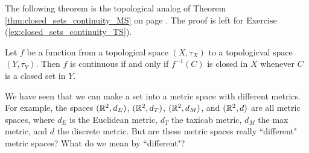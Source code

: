 \begin{comment}

\ActivitySolution

\ba

\item To show that $f$ is continuous we will prove that $f^{-1}(N)$ is a neighborhood of $a \in X$ whenever $N$ is a neighborhood of $f(a)$ in $Y$. 

\item Let $a \in X$ and let $N$ be a neighborhood of $f(a)$ in $Y$. Then $N$ contains an open set $O$ with $f(a) \in O$. 

\item By our hypothesis, we can conclude that $f^{-1}(O)$ is open in $X$. But if $x \in f^{-1}(O)$, then $f(x) \in O \subseteq N$. So $f^{-1}(O) \subseteq f^{-1}(N)$ and so $f^{-1}(N)$ is a neighborhood of $a$ in $X$. 

\item Since $a$ was chosen arbitrarily in $X$, we can conclude that $f^{-1}(N)$ is a neighborhood of $a$ in $X$ whenever $N$ is a neighborhood of $f(a)$ in $Y$. Therefore, $f$ is a continuous function.

\ea

\end{comment}

The following theorem is the topological analog of Theorem \ref{thm:closed_sets_continuity_MS} on page \pageref{thm:closed_sets_continuity_MS}. The proof is left for Exercise (\ref{ex:closed_sets_continuity_TS}).

\begin{theorem} \label{thm:closed_sets_continuity_TS} Let $f$ be a function from a topological space $(X,\tau_X)$ to a topologicval space $(Y,\tau_Y)$. Then $f$ is continuous if and only if $f^{-1}(C)$ is closed in $X$ whenever $C$ is a closed set in $Y$.  
\end{theorem}


We have seen that we can make a set into a metric space with different metrics. For example, the spaces $(\mathbb{R}^2, d_E)$, $(\mathbb{R}^2, d_T)$, $(\mathbb{R}^2, d_M)$, and $(\mathbb{R}^2, d)$ are all metric spaces, where $d_E$ is the Euclidean metric, $d_T$ the taxicab metric, $d_M$ the max metric, and $d$ the discrete metric. But are these metric spaces really ``different" metric spaces? What do we mean by ``different"? 


